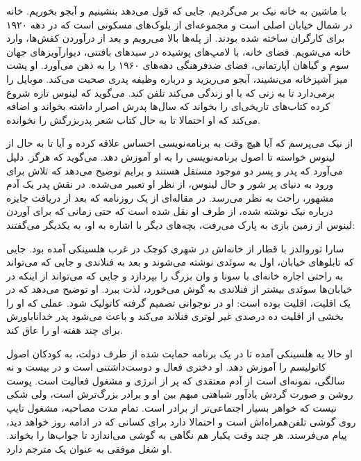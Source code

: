 \begin{journal}
با ماشین به خانه نیک بر می‌گردیم. جایی که قول می‌دهد بنشینیم و آبجو
بخوریم. خانه در شمال خیابان اصلی است و مجموعه‌ای از بلوک‌های مسکونی است
که در دهه ۱۹۲۰ برای کارگران ساخته شده بودند. از پله‌ها بالا می‌رویم و
بعد از درآوردن کفش‌ها، وارد خانه می‌شویم. فضای خانه، با لامپ‌های پوشیده
در سبدهای بافتنی، دیوارآویزهای جهان سوم و گیاهان آپارتمانی، فضای
ضدفرهنگی دهه‌های ۱۹۶۰ را به ذهن می‌آورد. او پشت میز آشپزخانه می‌نشیند،
آبجو می‌ریزید و درباره وظیفه پدری صحبت می‌کند.  موبایل را
برمی‌دارد تا به زنی که با او زندگی می‌کند تلفن کند. می‌گوید که لینوس تازه
شروع کرده کتاب‌های تاریخی‌ای را بخواند که سال‌ها پدرش اصرار داشته بخواند
و اضافه می‌کند که او احتمالا تا به حال کتاب شعر پدربزرگش را نخوانده.

از نیک می‌پرسم که آیا هیچ وقت به برنامه‌نویسی احساس علاقه کرده و آیا تا
به حال از لینوس خواسته تا اصول برنامه‌نویسی را به او آموزش دهد. می‌گوید
که هرگز. دلیل می‌آورد که پدر و پسر دو موجود مستقل هستند و برایم توضیح
می‌دهد که تلاش برای ورود به دنیای پر شور و حال لینوس، از نظر او
 تعبیر می‌شده. در نقش پدر یک آدم مشهور، راحت به
نظر می‌رسد. در مقاله‌ای از یک روزنامه که بعد از دریافت جایزه درباره نیک
نوشته شده، از طرف او نقل شده است که حتی زمانی که برای آوردن لینوس از
زمین بازی به پارک می‌رفت، بچه‌های دیگر با اشاره به او، به یکدیگر
می‌گفتند: 

\vspace*{30pt}

سارا توروالدز با قطار از خانه‌اش در شهری کوچک در غرب هلسینکی آمده
بود. جایی که تابلوهای خیابان، اول به سوئدی نوشته می‌شوند و بعد به
فنلاندی و جایی که می‌تواند به راحتی اجاره خانه‌ای با سونا و وان بزرگ را
بپردازد و جایی که می‌تواند از اینکه در خیابان‌ها سوئدی بیشتر از فنلاندی
به گوش می‌خورد، لذت ببرد. او توضیح می‌دهد که در یک اقلیت، اقلیت بوده
است: او در نوجوانی تصمیم گرفته کاتولیک شود. عملی که او را بخشی از
اقلیت ده درصدی غیر لوتری فنلاند می‌کند و باعث می‌شود پدر خداناباورش برای
چند هفته او را عاق کند.

او حالا به هلسینکی آمده تا در یک برنامه حمایت شده از طرف دولت، به
کودکان اصول کاتولیسم را آموزش دهد. او دختری فعال و دوست‌داشتنی است و در
بیست و نه سالگی، نمونه‌ای است از آدم معتقدی که پر از انرژی و مشغول
فعالیت است. پوست روشن و صورت گردش یادآور شباهتی مبهم بین او و برادر
بزرگ‌ترش است، ولی شکی نیست که خواهر بسیار اجتماعی‌تر از برادر است. تمام
مدت مصاحبه، مشغول تایپ روی گوشی تلفن‌همراه‌اش است و احتمالا دارد برای
کسانی که در ادامه روز خواهد دید، پیام می‌فرستد. هر چند وقت یکبار هم
نگاهی به گوشی می‌اندازد تا جواب‌ها را بخواند. او شغل موفقی به عنوان یک
مترجم دارد.


\end{journal}
